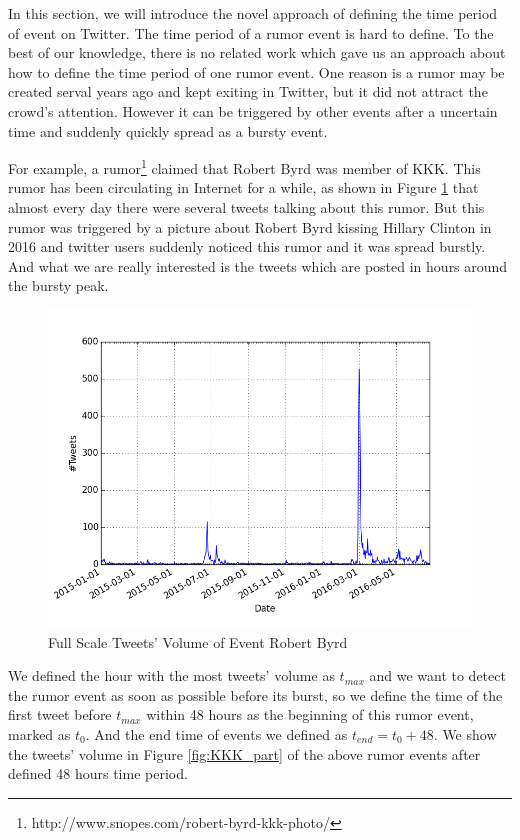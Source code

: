 In this section, we will introduce the novel approach of defining the time period of event on Twitter. The time period of a rumor event is hard to define. To the best of our knowledge, there is no related work which gave us an approach about how to define the time period of one rumor event. One reason is a rumor may be created serval years ago and kept exiting in Twitter, but it did not attract the crowd's attention. However it can be triggered by other events after a uncertain time and suddenly quickly spread as a bursty event.

For example, a rumor\footnote{http://www.snopes.com/robert-byrd-kkk-photo/} claimed that Robert Byrd was member of KKK. This rumor has been circulating in Internet for a while, as shown in Figure \ref{fig:KKK_full} that almost every day there were several tweets talking about this rumor. But this rumor was triggered by a picture about Robert Byrd kissing Hillary Clinton in 2016 and twitter users suddenly noticed this rumor and it was spread burstly. And what we are really interested is the tweets which are posted in hours around the bursty peak.
 
\begin{figure}[!h]
\centering
\includegraphics[width=0.7\columnwidth]{images/KKK_figure.png}
\caption{Full Scale Tweets' Volume of Event Robert Byrd}
\label{fig:KKK_full}
\end{figure}

 We defined the hour with the most tweets' volume as $t_{max}$ and we want to detect the rumor event as soon as possible before its burst, so we define the time of the first tweet before $t_{max}$ within 48 hours as the beginning of this rumor event, marked as $t_{0}$. And the end time of events we defined as $t_{end}=t_0+48$. We show the tweets' volume in Figure \ref{fig:KKK_part} of the above rumor events after defined 48 hours time period.
  
